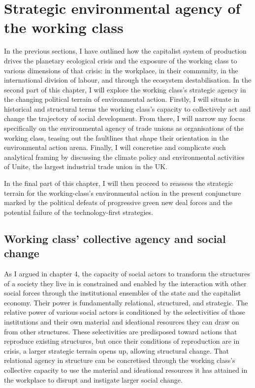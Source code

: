\documentclass[a4paper, nobind]{templates/ociamthesis}
\begin{document}
\hypertarget{strategic-environmental-agency-of-the-working-class}{%
\section{Strategic environmental agency of the working class}\label{strategic-environmental-agency-of-the-working-class}}

In the previous sections, I have outlined how the capitalist system of production drives the planetary ecological crisis and the exposure of the working class to various dimensions of that crisis: in the workplace, in their community, in the international division of labour, and through the ecosystem destabilisation. In the second part of this chapter, I will explore the working class's strategic agency in the changing political terrain of environmental action. Firstly, I will situate in historical and structural terms the working class's capacity to collectively act and change the trajectory of social development. From there, I will narrow my focus specifically on the environmental agency of trade unions as organisations of the working class, teasing out the faultlines that shape their orientation in the environmental action arena. Finally, I will concretise and complicate such analytical framing by discussing the climate policy and environmental activities of Unite, the largest industrial trade union in the UK.

In the final part of this chapter, I will then proceed to reassess the strategic terrain for the working-class's environmental action in the present conjuncture marked by the political defeats of progressive green new deal forces and the potential failure of the technology-first strategies.

\hypertarget{working-class-collective-agency-and-social-change}{%
\subsection{Working class' collective agency and social change}\label{working-class-collective-agency-and-social-change}}

As I argued in chapter 4, the capacity of social actors to transform the structures of a society they live in is constrained and enabled by the interaction with other social forces through the institutional ensembles of the state and the capitalist economy. Their power is fundamentally relational, structured, and strategic. The relative power of various social actors is conditioned by the selectivities of those institutions and their own material and ideational resources they can draw on from other structures. These selectivities are predisposed toward actions that reproduce existing structures, but once their conditions of reproduction are in crisis, a larger strategic terrain opens up, allowing structural change. That relational agency in structure can be concretised through the working class's collective capacity to use the material and ideational resources it has attained in the workplace to disrupt and instigate larger social change.
\end{document}

